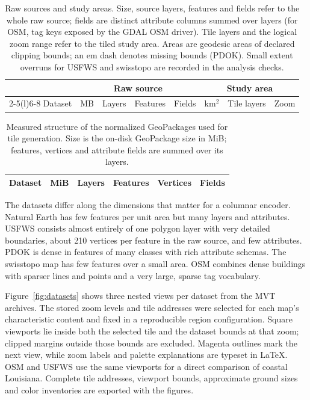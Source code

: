 \begin{table}[!tp]
\centering
\caption{Raw sources and study areas. Size, source layers, features and fields refer
to the whole raw source; fields are distinct attribute columns summed over layers (for
OSM, tag keys exposed by the GDAL OSM driver). Tile layers and the logical zoom range
refer to the tiled study area. Areas are geodesic areas of declared clipping bounds;
an em dash denotes missing bounds (PDOK). Small extent overruns for USFWS and
swisstopo are recorded in the analysis checks.}
\label{tab:datasets-structure}
\small
\setlength{\tabcolsep}{4pt}
\begin{tabular}{@{}l r r r r r r c@{}}
\toprule
 & \multicolumn{4}{c}{Raw source} & \multicolumn{3}{c}{Study area} \\
\cmidrule(lr){2-5}\cmidrule(l){6-8}
Dataset & MB & Layers & Features & Fields & km$^2$ & Tile layers & Zoom \\
\midrule

\end{tabular}
\end{table}

\begin{table}[!tp]
\centering
\caption{Measured structure of the normalized GeoPackages used for tile generation.
Size is the on-disk GeoPackage size in MiB; features, vertices and attribute fields
are summed over its layers.}
\label{tab:datasets-normalized}
\small
\begin{tabular}{@{}l r r r r r@{}}
\toprule
Dataset & MiB & Layers & Features & Vertices & Fields \\
\midrule

\end{tabular}
\end{table}

The datasets differ along the dimensions that matter for a columnar encoder.
Natural Earth has few features per unit area but many layers and attributes.
USFWS consists almost entirely of one polygon layer with very detailed boundaries,
about 210 vertices per feature in the raw source, and few attributes. PDOK is dense in
features of many classes with rich attribute schemas. The swisstopo map has few features
over a small area. OSM combines dense buildings with sparser lines and points and a very
large, sparse tag vocabulary.

Figure~\ref{fig:datasets} shows three nested views per dataset from the \VStd{}
MVT archives. The stored zoom levels and tile addresses were selected for each map's
characteristic content and fixed in a reproducible region configuration. Square
viewports lie inside both the selected tile and the dataset bounds at that zoom;
clipped margins outside those bounds are excluded. Magenta outlines mark the next
view, while zoom labels and palette explanations are typeset in LaTeX. OSM and USFWS
use the same viewports for a direct comparison of coastal Louisiana. Complete tile
addresses, viewport bounds, approximate ground sizes and color inventories are
exported with the figures.

